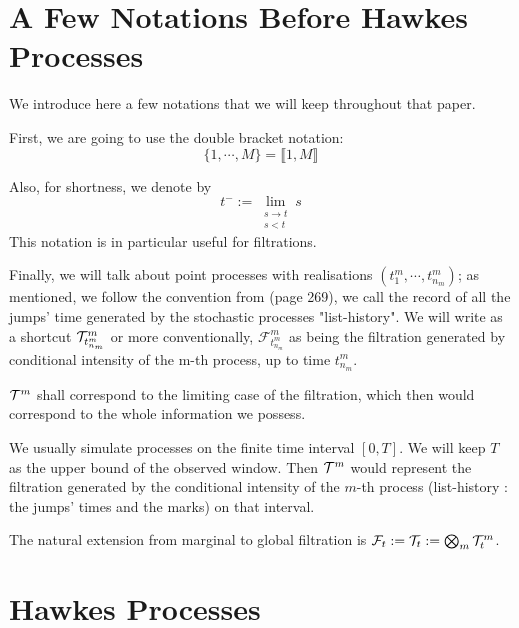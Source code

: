 \section{A Few Notations Before Hawkes Processes}
We introduce here a few notations that we will keep throughout that paper.

First, we are going to use the double bracket notation: 
$$ \{1, \cdots, M\} = \llbracket 1, M \rrbracket $$

Also, for shortness, we denote by $$t^- := \lim_{ \substack{ s \to t \\ s < t}  } s $$ This notation is in particular useful for filtrations.

Finally, we will talk about point processes with realisations $ ( t_{1}^m, \cdots , t_{n_m}^m ) $; as mentioned, we follow the convention from \cite{daley} (page 269), we call the record of all the jumps' time generated by the stochastic processes "list-history".  We will write as a shortcut  $ \mathcal{T}^m_{t_{n_m}^m } $ or more conventionally, $\mathcal F^m_{t_{n_m}^m }$ as being the filtration generated by conditional intensity of the m-th process, up to time $t_{n_m}^m$.

$ \mathcal{T}^m$ shall correspond to the limiting case of the filtration, which then would correspond to the whole information we possess. 

We usually simulate processes on the finite time interval $[0,T]$. We will keep $T$ as the upper bound of the observed window. Then $ \mathcal{T}^m$ would represent the filtration generated by the conditional intensity of the $m$-th process (list-history : the jumps' times and the marks) on that interval.

The natural extension from marginal to global filtration is $\mathcal F_t := \mathcal{T}_t := \bigotimes_m \mathcal{T}^m_t $.

\section{Hawkes Processes}
